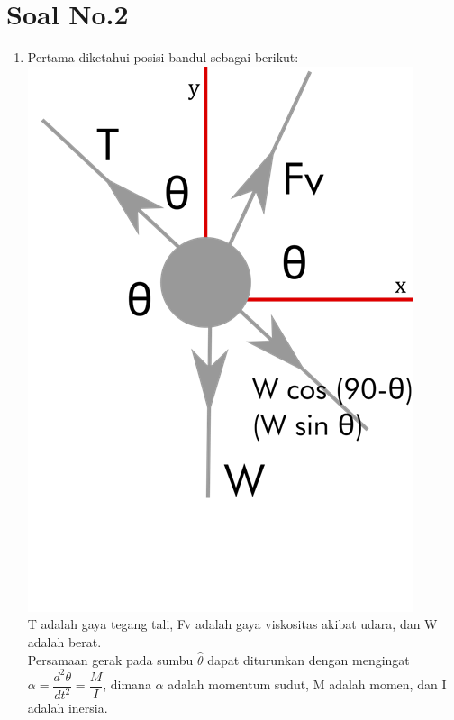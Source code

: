 \documentclass[12pt]{article}
\begin{document}
\section{Soal No.2}
		\begin{enumerate}[label=(\alph*)]
			\item 

			Pertama diketahui posisi bandul sebagai berikut:\\
			\includegraphics[scale=0.4]{UASFiskom0101.png}\\
			
			T adalah gaya tegang tali, Fv adalah gaya viskositas akibat udara, dan W adalah berat.\\
			Persamaan gerak pada sumbu $\hat{\theta}$ dapat diturunkan dengan mengingat $\alpha = \dfrac{d^2\theta}{dt^2} =\dfrac{M}{I}$, dimana $\alpha$ adalah momentum sudut, M adalah momen, dan I adalah inersia.
			

\end{enumerate}
\end{document}
